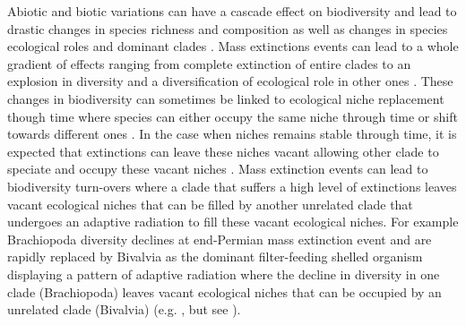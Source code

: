 \documentclass[12pt,letterpaper]{article}
\begin{document}


Abiotic and biotic variations can have a cascade effect on biodiversity and lead to drastic changes in species richness and composition as well as changes in species ecological roles and dominant clades \citep{Brusatte12092008}. Mass extinctions events can lead to a whole gradient of effects ranging from complete extinction of entire clades to an explosion in diversity and a diversification of ecological role in other ones \citep{Erwin1998344}. These changes in biodiversity can sometimes be linked to ecological niche replacement though time where species can either occupy the same niche through time or shift towards different ones \citep{Pearman2008149}. In the case when niches remains stable through time, it is expected that extinctions can leave these niches vacant allowing other clade to speciate and occupy these vacant niches \citep{Pearman2008149}. Mass extinction events can lead to biodiversity turn-overs where a clade that suffers a high level of extinctions leaves vacant ecological niches that can be filled by another unrelated clade that undergoes an adaptive radiation to fill these vacant ecological niches. For example Brachiopoda diversity declines at end-Permian mass extinction event and are rapidly replaced by Bivalvia as the dominant filter-feeding shelled organism displaying a pattern of adaptive radiation where the decline in diversity in one clade (Brachiopoda) leaves vacant ecological niches that can be occupied by an unrelated clade (Bivalvia) (e.g. \citealt{Sepkiski1981}, \citealt{CLAPHAM01102006} but see \citealt{Payne22052014}).
\end{document}
